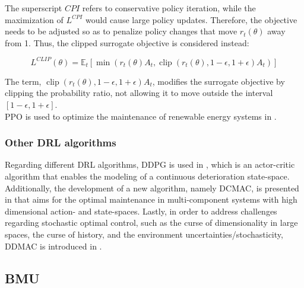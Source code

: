 The superscript $CPI$ refers to conservative policy iteration, while the maximization of $L^{C P I}$ would cause large policy updates. Therefore, the objective needs to be adjusted so as to penalize policy changes that move $r_t(\theta)$ away from 1. Thus, the clipped surrogate objective is considered instead:

\begin{equation}
    L^{C L I P}(\theta)=\mathbb{E}_{t}\left[\min \left(r_{t}(\theta) A_{t}, \operatorname{clip}\left(r_{t}(\theta), 1-\epsilon, 1+\epsilon\right) A_{t}\right)\right]
\end{equation}

The term, $\operatorname{clip}\left(r_{t}(\theta), 1-\epsilon, 1+\epsilon\right)A_t$, modifies the surrogate objective by clipping the probability ratio, not allowing it to move outside the interval $\left[ 1-\epsilon, 1+\epsilon \right]$.\\

\gls{PPO} is used to optimize the maintenance of renewable energy systems in \cite{pinciroli2022optimization}.

\subsubsection{Other \acrfull{DRL} algorithms}

Regarding different \gls{DRL} algorithms, \gls{DDPG} is used in \cite{chen2021deep}, which is an actor-critic algorithm that enables the modeling of a continuous deterioration state-space. Additionally, the development of a new algorithm, namely \gls{DCMAC}, is presented in \cite{andriotis2019managing} that aims for the optimal maintenance in multi-component systems with high dimensional action- and state-spaces. Lastly, in order to address challenges regarding stochastic optimal control, such as the curse of dimensionality in large spaces, the curse of history, and the environment uncertainties/stochasticity, \gls{DDMAC} is introduced in \cite{andriotis2021deep}.



\subsection{\acrfull{BMU}} \label{bmuSec}

